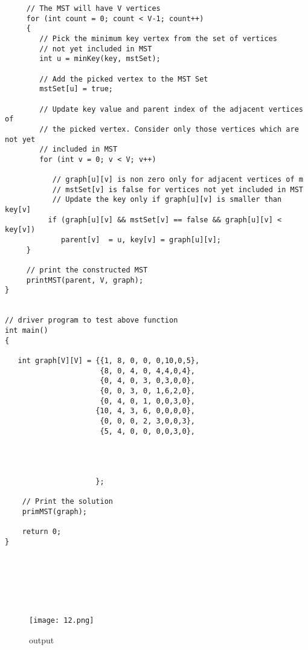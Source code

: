 \documentclass[11pt]{article}            %
\begin{document}
\begin{lstlisting}
     // The MST will have V vertices
     for (int count = 0; count < V-1; count++)
     {
        // Pick the minimum key vertex from the set of vertices
        // not yet included in MST
        int u = minKey(key, mstSet);
 
        // Add the picked vertex to the MST Set
        mstSet[u] = true;
 
        // Update key value and parent index of the adjacent vertices of
        // the picked vertex. Consider only those vertices which are not yet
        // included in MST
        for (int v = 0; v < V; v++)
 
           // graph[u][v] is non zero only for adjacent vertices of m
           // mstSet[v] is false for vertices not yet included in MST
           // Update the key only if graph[u][v] is smaller than key[v]
          if (graph[u][v] && mstSet[v] == false && graph[u][v] <  key[v])
             parent[v]  = u, key[v] = graph[u][v];
     }
 
     // print the constructed MST
     printMST(parent, V, graph);
}
 
 
// driver program to test above function
int main()
{
   
   int graph[V][V] = {{1, 8, 0, 0, 0,10,0,5},
                      {8, 0, 4, 0, 4,4,0,4},
                      {0, 4, 0, 3, 0,3,0,0},
                      {0, 0, 3, 0, 1,6,2,0},
                      {0, 4, 0, 1, 0,0,3,0},
	                 {10, 4, 3, 6, 0,0,0,0},
                      {0, 0, 0, 2, 3,0,0,3},
                      {5, 4, 0, 0, 0,0,3,0},

          
		  
		  
		             };
 
    // Print the solution
    primMST(graph);
 
    return 0;
}







\end{lstlisting}
\begin{figure*}
\centering
  \texttt{[image: 12.png]}
\caption{output}
\label{Figure:3}    
\end{figure*} 




 
\end{document}
